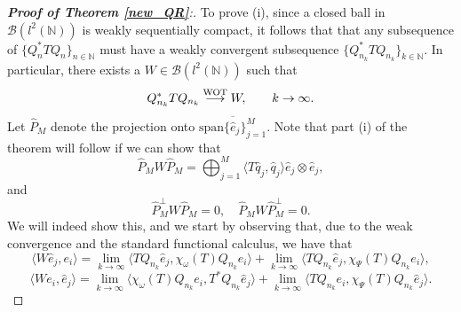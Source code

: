 \documentclass[a4paper,10pt]{article}
\begin{document}
\begin{proof}[\textbf{Proof of Theorem \ref{new_QR}}:]
To prove (i), since a closed ball in $\mathcal{B}(l^2(\mathbb{N}))$ is weakly sequentially compact, it follows that that any subsequence of $\{Q_n^*TQ_n\}_{n\in\mathbb{N}}$ must have a weakly convergent subsequence $\{Q_{n_k}^*TQ_{n_k}\}_{k\in\mathbb{N}}$. In particular, there exists a $W \in \mathcal{B}(l^2(\mathbb{N}))$ such that
$$
 Q_{n_k}^*TQ_{n_k} \stackrel{\text{\scriptsize WOT}}{\longrightarrow} W, \qquad k
\rightarrow \infty.
$$
Let $\widehat P_M$ denote the projection onto $\overline{\mathrm{span}\{\hat e_j\}_{j=1}^M}$. Note that part (i) of the theorem will follow if we can show that 
\begin{equation}\label{tjall}
\widehat P_M W \widehat P_M = \bigoplus_{j=1}^{M} \langle T\hat q_j,\hat q_j\rangle\hat e_j \otimes \hat e_j ,
\end{equation}
and 
$$
\widehat P_M^{\perp} W \widehat P_M = 0, \quad \widehat P_MW \widehat P_M^{\perp} = 0.
$$
We will indeed show this, and we start by observing that, due to the weak convergence and the standard functional calculus, we have that 
\begin{equation}\label{W}
\langle W \hat e_j, e_i \rangle  = \lim_{k\rightarrow \infty}\langle TQ_{n_k} \hat e_j, \chi_{\omega}(T)Q_{n_k} e_i \rangle + \lim_{k\rightarrow \infty}\langle TQ_{n_k} \hat e_j, \chi_{\Psi}(T) Q_{n_k}e_i \rangle, 
\end{equation}
\begin{equation}\label{W_2}
\langle W e_i,\hat e_j \rangle  = \lim_{k\rightarrow \infty}\langle \chi_{\omega}(T)Q_{n_k} e_i, T^*Q_{n_k} \hat e_j \rangle + \lim_{k\rightarrow \infty}\langle T Q_{n_k} e_i, \chi_{\Psi}(T)Q_{n_k} \hat e_j \rangle.
\end{equation}


\end{proof}
\end{document}
